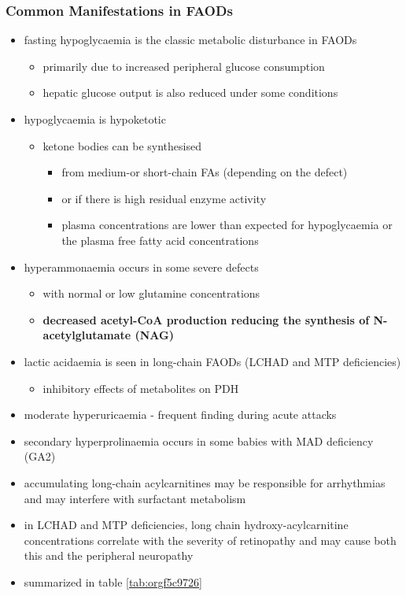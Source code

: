 \documentclass[12pt]{scrartcl}
\begin{document}
\subsubsection{Common Manifestations in FAODs}
\label{sec:org9e28d3d}
\begin{itemize}
\item fasting hypoglycaemia is the classic metabolic disturbance in FAODs
\begin{itemize}
\item primarily due to increased peripheral glucose consumption
\item hepatic glucose output is also reduced under some conditions
\end{itemize}
\item hypoglycaemia is hypoketotic
\begin{itemize}
\item ketone bodies can be synthesised
\begin{itemize}
\item from medium-or short-chain FAs (depending on the defect)
\item or if there is high residual enzyme activity
\item plasma concentrations are lower than expected for hypoglycaemia or the plasma free fatty acid concentrations
\end{itemize}
\end{itemize}
\item hyperammonaemia occurs in some severe defects
\begin{itemize}
\item with normal or low glutamine concentrations
\item \textbf{decreased acetyl-CoA production reducing the synthesis of N-acetylglutamate (NAG)}
\end{itemize}
\item lactic acidaemia is seen in long-chain FAODs (LCHAD and MTP deficiencies)
\begin{itemize}
\item inhibitory effects of metabolites on PDH
\end{itemize}
\item moderate hyperuricaemia - frequent finding during acute attacks
\item secondary hyperprolinaemia occurs in some babies with MAD deficiency (GA2)
\item accumulating long-chain acylcarnitines may be responsible for
arrhythmias and may interfere with surfactant metabolism
\item in LCHAD and MTP deficiencies, long chain hydroxy-acylcarnitine
concentrations correlate with the severity of retinopathy and may
cause both this and the peripheral neuropathy
\end{itemize}
\begin{itemize}
\item summarized in table \ref{tab:orgf5c9726}
\end{itemize}
\end{document}
